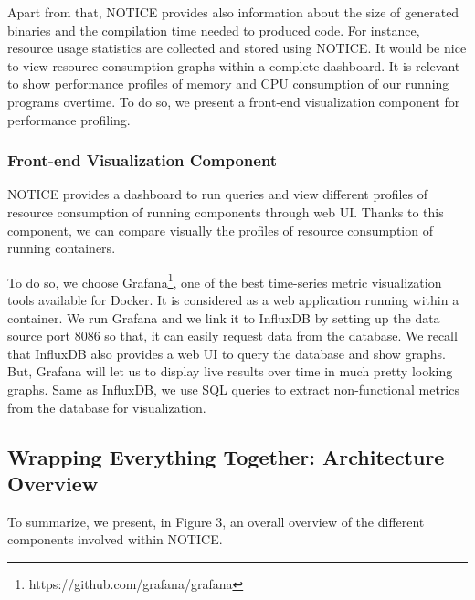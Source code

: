 Apart from that, NOTICE provides also information about the size of generated binaries and the compilation time needed to produced code.
For instance, resource usage statistics are collected and stored using NOTICE. It would be nice to view resource consumption graphs within a complete dashboard. It is relevant to show performance profiles of memory and CPU consumption of our running programs overtime. To do so, we present a front-end visualization component for performance profiling. 

\subsubsection{Front-end Visualization Component}
NOTICE provides a dashboard to run queries and view different profiles of resource consumption of running components through web UI. 
Thanks to this component, we can compare visually the profiles of resource consumption of running containers. 

To do so, we choose Grafana\footnote{https://github.com/grafana/grafana}, one of the best time-series metric visualization tools available for Docker. It is considered as a web application running within a container. We run Grafana and we link it to InfluxDB by setting up the data source port 8086 so that, it can easily request data from the database. 
We recall that InfluxDB also provides a web UI to query the database and show graphs. But, Grafana will let us to display live results over time in much pretty looking graphs. Same as InfluxDB, we use SQL queries to extract non-functional metrics from the database for visualization.

\subsection{Wrapping Everything Together: Architecture Overview}
To summarize, we present, in Figure 3, an overall overview of the different components involved within NOTICE.

